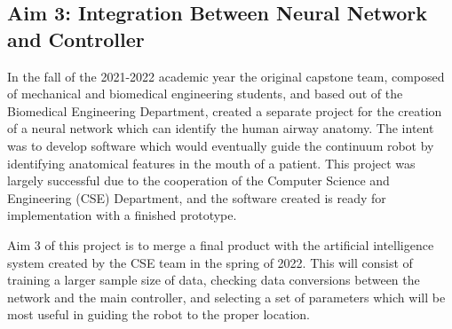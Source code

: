 	\subsection{Aim 3: Integration Between Neural Network and Controller}
	\label{subsect:aim3}
	
		In the fall of the 2021-2022 academic year the original capstone team, composed of mechanical and biomedical engineering students, and based out of the Biomedical Engineering Department, created a separate project for the creation of a neural network which can identify the human airway anatomy. The intent was to develop software which would eventually guide the continuum robot by identifying anatomical features in the mouth of a patient. This project was largely successful due to the cooperation of the Computer Science and Engineering (CSE) Department, and the software created is ready for implementation with a finished prototype.
	
		Aim 3 of this project is to merge a final product with the artificial intelligence system created by the CSE team in the spring of 2022. This will consist of training a larger sample size of data, checking data conversions between the network and the main controller, and selecting a set of parameters which will be most useful in guiding the robot to the proper location.
